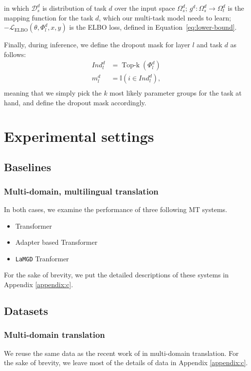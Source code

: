 \documentclass[11pt]{article}
\newcommand{\fyDone}[1]{\done[FY]\Todo[FY:]{\textcolor{orange}{#1}}}
\newcommand{\system}[1]{\texttt{{#1}}}
\begin{document}
in which $\mathcal{D}_s^d$ is distribution of task $d$ over the input space $\Omega^d_s$; $g^d: \Omega^d_s \rightarrow \Omega^d_t$\fyDone{allready defined} is the mapping function for the task $d$, which our multi-task model needs to learn; $-\mathcal{L}_{\text{ELBO}}(\theta,\Phi_l^d,x,y)$ is the ELBO loss, defined in Equation~\ref{eq:lower-bound}.

Finally, during inference, we define the dropout mask for layer $l$ and task $d$ as follows:
\begin{align*}
  Ind_l^d &= \operatorname{Top-k}(\Phi_l^d) \\
  m_l^d &= \mathbb{I}(i\in Ind_l^d),\\
\end{align*}
meaning that we simply pick the $k$ most likely parameter groups for the task at hand, and define the dropout mask accordingly.

\section{Experimental settings}
\subsection{Baselines}
\subsubsection{Multi-domain, multilingual translation}
In both cases, we examine the performance of three following MT systems.
\begin{itemize}
	\item Transformer
	\item Adapter based Transformer
	\item \system{LaMGD} Tranformer
\end{itemize}
For the sake of brevity, we put the detailed descriptions of these systems in Appendix \ref{appendix:c}.
\subsection{Datasets}
\subsubsection{Multi-domain translation}
We reuse the same data as the recent work of \citet{Pham21revisiting} in multi-domain translation. For the sake of brevity, we leave most of the details of data in Appendix \ref{appendix:c}.
\end{document}
